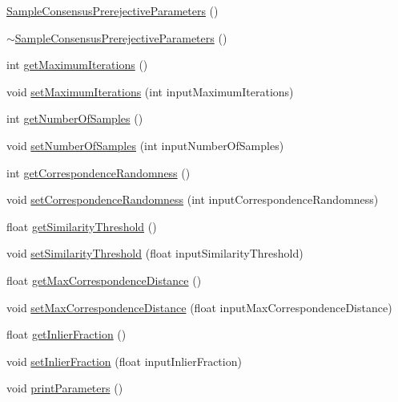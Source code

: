 \begin{DoxyCompactItemize}
\item 
\hyperlink{classSampleConsensusPrerejectiveParameters_a4d78aa289e1f069e53789e4dfcfd3e82}{Sample\-Consensus\-Prerejective\-Parameters} ()
\item 
\hyperlink{classSampleConsensusPrerejectiveParameters_a5c5840d6e7769ca19ea8a040982566d6}{$\sim$\-Sample\-Consensus\-Prerejective\-Parameters} ()
\item 
int \hyperlink{classSampleConsensusPrerejectiveParameters_ab96f9008253a7565c278a732442a27c1}{get\-Maximum\-Iterations} ()
\item 
void \hyperlink{classSampleConsensusPrerejectiveParameters_ae370838a49786c7f0c7e3924d6a9c475}{set\-Maximum\-Iterations} (int input\-Maximum\-Iterations)
\item 
int \hyperlink{classSampleConsensusPrerejectiveParameters_a1b139e68804c982209f3e62f8394063f}{get\-Number\-Of\-Samples} ()
\item 
void \hyperlink{classSampleConsensusPrerejectiveParameters_a393cf62707ccd8af4833ce9bb309ebe9}{set\-Number\-Of\-Samples} (int input\-Number\-Of\-Samples)
\item 
int \hyperlink{classSampleConsensusPrerejectiveParameters_ac4464d152a94d6dd48fb7a2922c4984b}{get\-Correspondence\-Randomness} ()
\item 
void \hyperlink{classSampleConsensusPrerejectiveParameters_a9394ad98561f4f27d2e6ca916aeb726c}{set\-Correspondence\-Randomness} (int input\-Correspondence\-Randomness)
\item 
float \hyperlink{classSampleConsensusPrerejectiveParameters_a029abb8ed45408a4c1c2d2a8775ccead}{get\-Similarity\-Threshold} ()
\item 
void \hyperlink{classSampleConsensusPrerejectiveParameters_ae247826cf017892f1ec1d32bcf992a93}{set\-Similarity\-Threshold} (float input\-Similarity\-Threshold)
\item 
float \hyperlink{classSampleConsensusPrerejectiveParameters_a7cc9ee4df20cc7b6fcaa990d282489fc}{get\-Max\-Correspondence\-Distance} ()
\item 
void \hyperlink{classSampleConsensusPrerejectiveParameters_a47ce343173113beb8ec06df605dc1a19}{set\-Max\-Correspondence\-Distance} (float input\-Max\-Correspondence\-Distance)
\item 
float \hyperlink{classSampleConsensusPrerejectiveParameters_aa48e0b343b0b9c3186e300777211e8be}{get\-Inlier\-Fraction} ()
\item 
void \hyperlink{classSampleConsensusPrerejectiveParameters_a787a753f89bf4ff919fe1f0fbbe504e6}{set\-Inlier\-Fraction} (float input\-Inlier\-Fraction)
\item 
void \hyperlink{classSampleConsensusPrerejectiveParameters_aa194d51a863d703b9cbdbc264eeb9da3}{print\-Parameters} ()
\end{DoxyCompactItemize}
